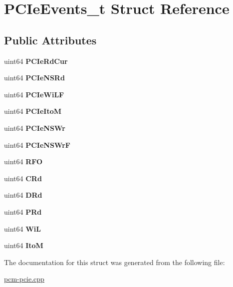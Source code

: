 \hypertarget{struct_p_c_ie_events__t}{}\section{P\+C\+Ie\+Events\+\_\+t Struct Reference}
\label{struct_p_c_ie_events__t}
\subsection*{Public Attributes}
\begin{DoxyCompactItemize}
\item 
\mbox{\label{struct_p_c_ie_events__t_a433814915b2f0fb5673db7d42b5c8f01}} 
uint64 {\bfseries P\+C\+Ie\+Rd\+Cur}
\item 
\mbox{\label{struct_p_c_ie_events__t_a72c70536a99db58c0ffbee2b0f949cb9}} 
uint64 {\bfseries P\+C\+Ie\+N\+S\+Rd}
\item 
\mbox{\label{struct_p_c_ie_events__t_a11255eae6dfabbe8f64f7b5ea818cd8a}} 
uint64 {\bfseries P\+C\+Ie\+Wi\+LF}
\item 
\mbox{\label{struct_p_c_ie_events__t_a6361b1a7d4ef44d4a9ce98be95ef1f98}} 
uint64 {\bfseries P\+C\+Ie\+ItoM}
\item 
\mbox{\label{struct_p_c_ie_events__t_adc09e10dc946626835a246c2ad23f673}} 
uint64 {\bfseries P\+C\+Ie\+N\+S\+Wr}
\item 
\mbox{\label{struct_p_c_ie_events__t_afd92992ddfa7437bc37846ce8b26298b}} 
uint64 {\bfseries P\+C\+Ie\+N\+S\+WrF}
\item 
\mbox{\label{struct_p_c_ie_events__t_a22e3b41c0ce557fdbb8ff95b467ffbeb}} 
uint64 {\bfseries R\+FO}
\item 
\mbox{\label{struct_p_c_ie_events__t_a6eb5d5b01e893a54069d20a1e8ab1e00}} 
uint64 {\bfseries C\+Rd}
\item 
\mbox{\label{struct_p_c_ie_events__t_aacf52abcf1e3417903975e9287b3ab8d}} 
uint64 {\bfseries D\+Rd}
\item 
\mbox{\label{struct_p_c_ie_events__t_af24f33e0b4ed7b25606d5ef495b70c37}} 
uint64 {\bfseries P\+Rd}
\item 
\mbox{\label{struct_p_c_ie_events__t_a34ae70c8bf61d8a8d50fd671a3fb62b8}} 
uint64 {\bfseries WiL}
\item 
\mbox{\label{struct_p_c_ie_events__t_a09e7e597f7eb1b569e6aefbe02dbf790}} 
uint64 {\bfseries ItoM}
\end{DoxyCompactItemize}


The documentation for this struct was generated from the following file\+:\begin{DoxyCompactItemize}
\item 
\mbox{\hyperlink{pcm-pcie_8cpp}{pcm-\/pcie.\+cpp}}\end{DoxyCompactItemize}
